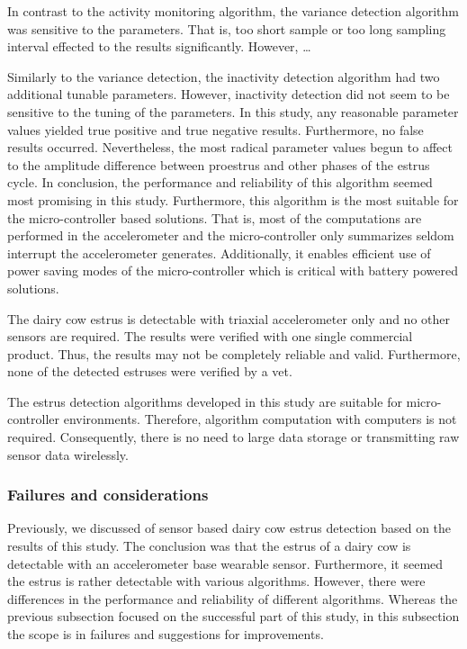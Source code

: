 \documentclass[english,12pt,a4paper,pdftex,elec,utf8]{aaltothesis}
\begin{document}
In contrast to the activity monitoring algorithm, the variance detection algorithm was sensitive to the parameters. That is, too short sample or too long sampling interval effected to the results significantly. However, \dots

Similarly to the variance detection, the inactivity detection algorithm had two additional tunable parameters. However, inactivity detection did not seem to be sensitive to the tuning of the parameters. In this study, any reasonable parameter values yielded true positive and true negative results. Furthermore, no false results occurred. Nevertheless,  the most radical parameter values begun to affect to the amplitude difference between proestrus and other phases of the estrus cycle. In conclusion, the performance and reliability of this algorithm seemed most promising in this study. Furthermore, this algorithm is the most suitable for the micro-controller based solutions. That is, most of the computations are performed in the accelerometer and the micro-controller only summarizes seldom interrupt the accelerometer generates. Additionally, it enables efficient use of power saving modes of the micro-controller which is critical with battery powered solutions. 


The dairy cow estrus is detectable with triaxial accelerometer only and no other sensors are required. The results were verified with one single commercial product. Thus, the results may not be completely reliable and valid. Furthermore, none of the detected estruses were verified by a vet.

The estrus detection algorithms developed in this study are suitable for micro-controller environments. Therefore, algorithm computation with computers is not required. Consequently, there is no need to large data storage or transmitting raw sensor data wirelessly.


\subsubsection{Failures and considerations}

Previously, we discussed of sensor based dairy cow estrus detection based on the results of this study. The conclusion was that the estrus of a dairy cow is detectable with an accelerometer base wearable sensor. Furthermore, it seemed the estrus is rather detectable with various algorithms. However, there were differences in the performance and reliability of different algorithms. Whereas the previous subsection focused on the successful part of this study, in this subsection the scope is in failures and suggestions for improvements.
\end{document}

